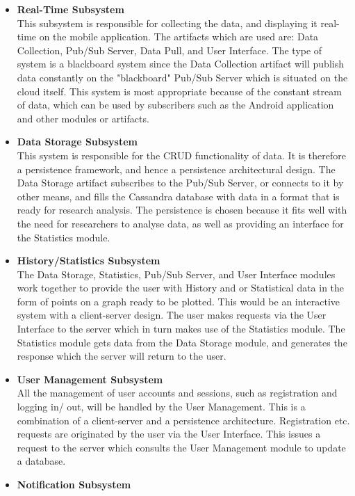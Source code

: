 \begin{itemize}
	\item \textbf{Real-Time Subsystem}\\
	This subsystem is responsible for collecting the data, and displaying it real-time on the mobile application. The artifacts which are used are: Data Collection,  Pub/Sub Server, Data Pull, and User Interface. The type of system is a blackboard system since the Data Collection artifact will publish data constantly on the "blackboard" Pub/Sub Server which is situated on the cloud itself. This system is most appropriate because of the constant stream of data, which can be used by subscribers such as the Android application and other modules or artifacts. 
	\item \textbf{Data Storage Subsystem}\\
	This system is responsible for the CRUD functionality of data. It is therefore a persistence framework, and hence a persistence architectural design. The Data Storage artifact subscribes to the Pub/Sub Server, or connects to it by other means, and fills the Cassandra database with data in a format that is ready for research analysis. The persistence is chosen because it fits well with the need for researchers to analyse data, as well as providing an interface for the Statistics module. 
	\item \textbf{History/Statistics Subsystem}\\
	The Data Storage, Statistics, Pub/Sub Server, and User Interface modules work together to provide the user with History and or Statistical data in the form of points on a graph ready to be plotted. This would be an interactive system with a client-server design. The user makes requests via the User Interface to the server which in turn makes use of the Statistics module. The Statistics module gets data from the Data Storage module, and generates the response which the server will return to the user.
	\item \textbf{User Management Subsystem}\\
	All the management of user accounts and sessions, such as registration and logging in/ out, will be handled by the User Management. This is a combination of a client-server and a persistence architecture. Registration etc. requests are originated by the user via the User Interface. This issues a request to the server which consults the User Management module to update a database. 
	\item \textbf{Notification Subsystem}\\

\end{itemize}
